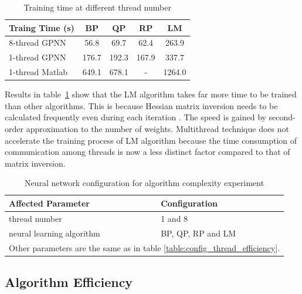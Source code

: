\documentclass[procedia]{easychair}
\begin{document}
\begin{table}[htp]
    \centering
    \caption{Training time at different thread number}
    \begin{tabular}{ l c c c c }
        \hline \hline
        Traing Time (s) & BP & QP & RP & LM \\
        \hline
        8-thread GPNN & 56.8 & 69.7 & 62.4 & 263.9 \\
        1-thread GPNN & 176.7 & 192.3 & 167.9 & 337.7 \\
        1-thread Matlab & 649.1 & 678.1 & - & 1264.0 \\
        \hline \hline
    \end{tabular}
    \label{table:algorithm_complexity}
\end{table}

Results in table~\ref{table:algorithm_complexity} show that the LM algorithm takes far more time to be trained than other algorithms.  This is because Hessian matrix inversion needs to be calculated frequently even during each iteration \cite{yu2011levenberg}.  The speed is gained by second-order approximation to the number of weights.  Multithread technique does not accelerate the training process of LM algorithm because the time consumption of communication among threads is now a less distinct factor compared to that of matrix inversion.

\begin{table}[htp]
    \centering
    \caption{Neural network configuration for algorithm complexity experiment}
    \begin{tabular}{ l l }
        \hline \hline
        Affected Parameter & Configuration \\
        \hline
        thread number & 1 and 8 \\
        neural learning algorithm & BP, QP, RP and LM \\
        \multicolumn{2}{c}{Other parameters are the same as in table \ref{table:config_thread_efficiency}.} \\
        \hline \hline
    \end{tabular}
    \label{table:config_algorithm_complexity}
\end{table}

\subsection{Algorithm Efficiency}
\end{document}
